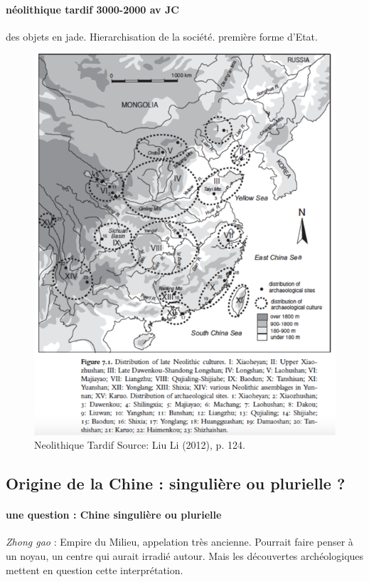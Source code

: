 \paragraph{néolithique tardif 3000-2000 av JC} des objets en jade. Hierarchisation de la société. première forme d'Etat.
\begin{figure}[!h]
    \centering
        \caption{Neolithique Tardif
        Source: Liu Li (2012), p. 124.}
\includegraphics[width= .6\textwidth]{ConfucianismeTaoismeBouddhismeChinois/Images/NeolithiqueTardif.png}

    \label{fig:enter-label}
\end{figure}



\FloatBarrier
\subsection{Origine de la Chine : singulière ou plurielle ?}
\paragraph{une question : Chine singulière ou plurielle} \textit{Zhong gao} : Empire du Milieu, appelation très ancienne. Pourrait faire penser à un noyau, un centre qui aurait irradié autour. Mais les découvertes archéologiques mettent en question cette interprétation. 

